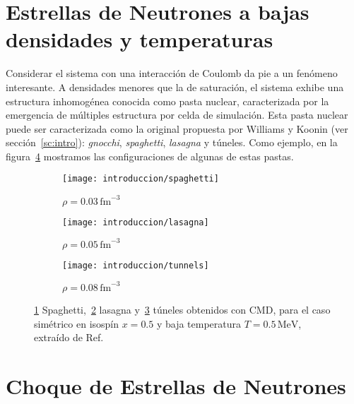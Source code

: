 \section{Estrellas de Neutrones a bajas densidades y temperaturas}\label{sc:nsm_lowd}

Considerar el sistema con una interacción de Coulomb da pie a un fenómeno interesante.
A densidades menores que la de saturación, el sistema exhibe una estructura inhomogénea conocida como pasta nuclear, caracterizada por la emergencia de múltiples estructura por celda de simulación.
Esta pasta nuclear puede ser caracterizada como la original propuesta por Williams y Koonin (ver sección~\ref{sc:intro}): \emph{gnocchi}, \emph{spaghetti}, \emph{lasagna} y túneles.
Como ejemplo, en la figura~\ref{fig:pasta} mostramos las configuraciones de algunas de estas pastas.


\begin{figure}[h]
  \begin{subfigure}[h!]{0.48\columnwidth}
    \texttt{[image: introduccion/spaghetti]}
    \caption{$\rho = 0.03\,\text{fm}^{-3}$}
    \label{sfig:spaghetti}
  \end{subfigure}
  \begin{subfigure}[h!]{0.48\columnwidth}
    \texttt{[image: introduccion/lasagna]}
    \caption{$\rho = 0.05\,\text{fm}^{-3}$}
    \label{sfig:lasagna}
  \end{subfigure}
  \begin{subfigure}[h!]{0.48\columnwidth}
    \texttt{[image: introduccion/tunnels]}
    \caption{$\rho = 0.08\,\text{fm}^{-3}$}
    \label{sfig:tunnels}
  \end{subfigure}
  \centering
  \caption{\ref{sfig:spaghetti} Spaghetti,~\ref{sfig:lasagna} lasagna y~\ref{sfig:tunnels} túneles obtenidos con CMD, para el caso simétrico en isospín $x=0.5$ y baja temperatura $T=0.5\,\text{MeV}$, extraído de Ref.~\cite{alcain_effect_2014}}
  \label{fig:pasta}
\end{figure}

\section{Choque de Estrellas de Neutrones}

